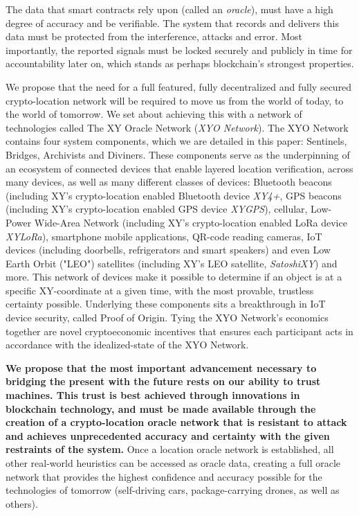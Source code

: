 \documentclass{article}
\begin{document}
The data that smart contracts rely upon (called an \textit{oracle}), must have a high degree of accuracy and be verifiable. The system that records and delivers this data must be protected from the interference, attacks and error. Most importantly, the reported signals must be locked securely and publicly in time for accountability later on, which stands as perhaps blockchain's strongest properties.

We propose that the need for a full featured, fully decentralized and fully secured crypto-location network will be required to move us from the world of today, to the world of tomorrow. We set about achieving this with a network of technologies called The XY Oracle Network (\textit{XYO Network}). The XYO Network contains four system components, which we are detailed in this paper: Sentinels, Bridges, Archivists and Diviners. These components serve as the underpinning of an ecosystem of connected devices that enable layered location verification, across many devices, as well as many different classes of devices: Bluetooth beacons (including XY's crypto-location enabled Bluetooth device \textit{XY4+}, GPS beacons (including XY's crypto-location enabled GPS device \textit{XYGPS}), cellular, Low-Power Wide-Area Network (including XY's crypto-location enabled LoRa device \textit{XYLoRa}), smartphone mobile applications, QR-code reading cameras, IoT devices (including doorbells, refrigerators and smart speakers) and even Low Earth Orbit ("LEO") satellites (including XY's LEO satellite, \textit{SatoshiXY}) and more. This network of devices make it possible to determine if an object is at a specific XY-coordinate at a given time, with the most provable, trustless certainty possible. Underlying these components sits a breakthrough in IoT device security, called Proof of Origin. Tying the XYO Network's economics together are novel cryptoeconomic incentives that ensures each participant acts in accordance with the idealized-state of the XYO Network.

\textbf{We propose that the most important advancement necessary to bridging the present with the future rests on our ability to trust machines. This trust is best achieved through innovations in blockchain technology, and must be made available through the creation of a crypto-location \gls{oracle} network that is resistant to attack and achieves unprecedented \gls{accuracy} and \gls{certainty} with the given restraints of the system.} Once a location oracle network is established, all other real-world \glspl{heuristic} can be accessed as oracle data, creating a full oracle network that provides the highest confidence and accuracy possible for the technologies of tomorrow (self-driving cars, package-carrying drones, as well as others).
\end{document}
